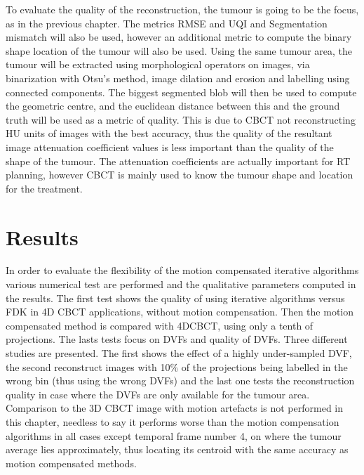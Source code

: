 To evaluate the quality of the reconstruction, the tumour is going to be the focus, as  in the previous chapter. The metrics RMSE and UQI and Segmentation mismatch will also be used, however an additional metric to compute the binary shape location of the tumour will also be used.  Using the same tumour area, the tumour will be extracted using morphological operators on images, via binarization with Otsu's method, image dilation and erosion and labelling using connected components. The biggest segmented blob will then be used to compute the geometric centre, and the euclidean distance between this and the ground truth will be used as a metric of quality. This is due to CBCT not reconstructing HU units of images with the best accuracy, thus the quality of the resultant image attenuation coefficient values is less important than the quality of the shape of the tumour. The attenuation coefficients are actually important for RT planning, however CBCT is mainly used to know the tumour shape and location for the treatment.




\section{Results}

In order to evaluate the flexibility of the motion compensated iterative algorithms various numerical test are performed and the qualitative parameters computed in the results. The first test shows the quality of using iterative algorithms versus FDK in 4D CBCT applications, without motion compensation. Then the motion compensated method is compared with 4DCBCT, using only a tenth of projections. The lasts tests focus on DVFs and quality of DVFs. Three different studies are presented. The first shows the effect of a highly under-sampled DVF, the second reconstruct images with 10\% of the projections being labelled in the wrong bin (thus using the wrong DVFs) and the last one tests the reconstruction quality in case where the DVFs are only available for the tumour area. Comparison to the 3D CBCT image with motion artefacts is not performed in this chapter, needless to say it performs worse than the motion compensation algorithms in all cases except temporal frame number 4, on where the tumour average lies approximately, thus locating its centroid with the same accuracy as motion compensated methods.


